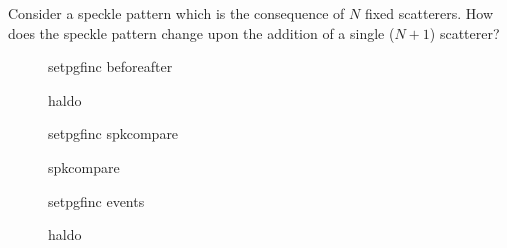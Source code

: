 
Consider a speckle pattern which is the consequence of $N$ fixed
scatterers.  How does the speckle pattern change upon the addition of a
single ($N+1$) scatterer?  

\begin{figure}
\centering
{setpgfinc}
{beforeafter}
\caption{haldo}
\label{fig:scattbeforeafter}
\end{figure}

\begin{figure}
\centering
{setpgfinc}
{spkcompare}
\caption{spkcompare}
\label{fig:scattspkcompare}
\end{figure}

\begin{figure}
\centering
{setpgfinc}
{events}
\caption{haldo}
\label{fig:scattbeforeafter}
\end{figure}


